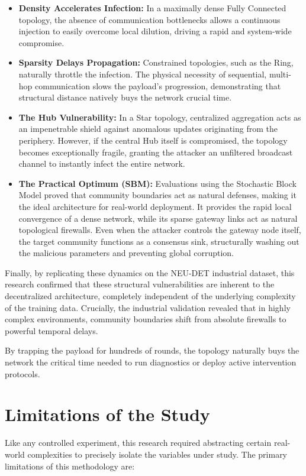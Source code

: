 \begin{itemize}
    \item \textbf{Density Accelerates Infection:} In a maximally dense Fully Connected topology, the absence of communication bottlenecks allows a continuous injection to easily overcome local dilution, driving a rapid and system-wide compromise.
    \item \textbf{Sparsity Delays Propagation:} Constrained topologies, such as the Ring, naturally throttle the infection. The physical necessity of sequential, multi-hop communication slows the payload's progression, demonstrating that structural distance natively buys the network crucial time.
    \item \textbf{The Hub Vulnerability:} In a Star topology, centralized aggregation acts as an impenetrable shield against anomalous updates originating from the periphery. However, if the central Hub itself is compromised, the topology becomes exceptionally fragile, granting the attacker an unfiltered broadcast channel to instantly infect the entire network.
    \item \textbf{The Practical Optimum (SBM):} Evaluations using the Stochastic Block Model proved that community boundaries act as natural defenses, making it the ideal architecture for real-world deployment. It provides the rapid local convergence of a dense network, while its sparse gateway links act as natural topological firewalls. Even when the attacker controls the gateway node itself, the target community functions as a consensus sink, structurally washing out the malicious parameters and preventing global corruption.
\end{itemize}

Finally, by replicating these dynamics on the NEU-DET industrial dataset, this research confirmed that these structural vulnerabilities are inherent to the decentralized architecture, completely independent of the underlying complexity of the training data. Crucially, the industrial validation revealed that in highly complex environments, community boundaries shift from absolute firewalls to powerful temporal delays.

By trapping the payload for hundreds of rounds, the topology naturally buys the network the critical time needed to run diagnostics or deploy active intervention protocols.

\section{Limitations of the Study}
Like any controlled experiment, this research required abstracting certain real-world complexities to precisely isolate the variables under study. The primary limitations of this methodology are:

